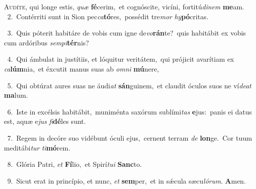 \lettrine{\initial\textcolor{\initialcolor}{A}}{udíte,} qui longe estis, \textit{quæ} \textbf{fé}\-cerim,~\star et cognóscite, vicíni, fortitú\-\textit{di}\-\textit{nem} \textbf{me}\-am.\\
{\numbfont\textcolor{\numbcolor}{~2.}}~Contérriti sunt in Sion pec\-\textit{ca}\-\textbf{tó}res,~\star possédit tre\textit{mor} \textit{hy}\-\textbf{pó}critas.\par
{\numbfont\textcolor{\numbcolor}{~3.}}~Quis póterit habitáre de vobis cum igne de\-\textit{vo}\-\textbf{rán}te?~\star quis habitábit ex vobis cum ardóribus \textit{sem}\-\textit{pi}\textbf{tér}nis?\par
{\numbfont\textcolor{\numbcolor}{~4.}}~Qui ámbulat in justítiis, et lóquitur veritátem,~\dagger qui prójicit avarítiam ex \textit{ca}\-\textbf{lúm}nia,~\star et éxcutit manus suas ab \textit{om}\-\textit{ni} \textbf{mú}\-nere,\par
{\numbfont\textcolor{\numbcolor}{~5.}}~Qui obtúrat aures suas ne áudi\textit{at} \textbf{sán}\-guinem,~\star et claudit óculos suos ne ví\-\textit{de}\-\textit{at} \textbf{ma}\-lum.\par
{\numbfont\textcolor{\numbcolor}{~6.}}~Iste in excélsis habitábit,~\dagger muniménta saxórum sublími\textit{tas} \textbf{e}\-jus:~\star panis ei datus est, aquæ e\textit{jus} \textit{fi}\-\textbf{dé}les sunt.\par
{\numbfont\textcolor{\numbcolor}{~7.}}~Regem in decóre suo vidébunt óculi ejus,~\dagger cernent terram \textit{de} \textbf{lon}\-ge.~\star Cor tuum meditábi\textit{tur} \textit{ti}\-\textbf{mó}rem.\par
{\numbfont\textcolor{\numbcolor}{~8.}}~Glória Patri, \textit{et} \textbf{Fí}\-lio,~\star et Spirí\-\textit{tu}\-\textit{i} \textbf{Sanc}\-to.\par
{\numbfont\textcolor{\numbcolor}{~9.}}~Sicut erat in princípio, et nunc, \textit{et} \textbf{sem}\-per,~\star et in sǽcula sæcu\-\textit{ló}\-\textit{rum}. \textbf{A}\-men.\par
